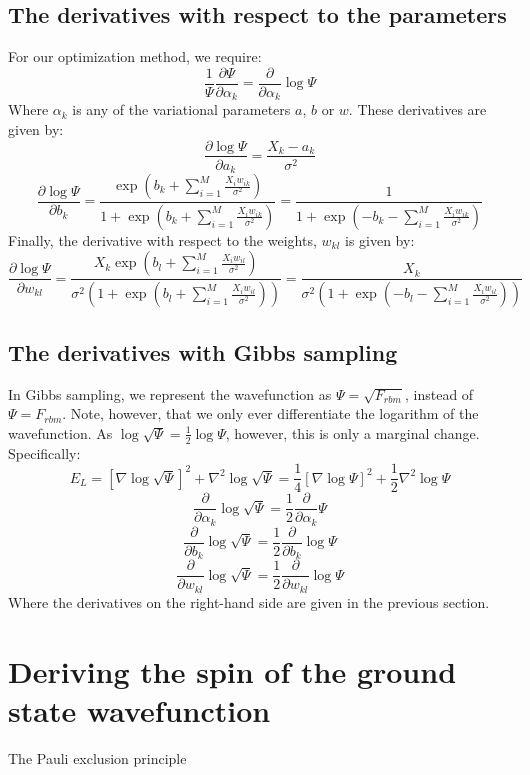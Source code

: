 \documentclass[a4paper, 10pt]{article}
\begin{document}
\begin{appendices}
	\subsection{The derivatives with respect to the parameters}
	For our optimization method, we require:
	\begin{equation}
	\frac{1}{\Psi}\frac{\partial \Psi}{\partial \alpha_k}=\frac{\partial }{\partial \alpha_k}\log \Psi
	\end{equation}
	Where $\alpha_k$ is any of the variational parameters $a$, $b$ or $w$. These derivatives are given by:
	\begin{equation}
	\frac{\partial \log \Psi }{\partial a_k}=\frac{X_k-a_k}{\sigma^2}
	\end{equation}
	\begin{equation}
	\frac{\partial \log \Psi}{\partial b_k}=\frac{\exp \left(b_k+\sum_{i=1}^M \frac{X_iw_{ik}}{\sigma^2}\right)}{1+\exp \left(b_k+\sum_{i=1}^M \frac{X_iw_{ik}}{\sigma^2}\right)}=\frac{1}{1+\exp \left(-b_k-\sum_{i=1}^M \frac{X_i w_{ik}}{\sigma^2}\right)}
	\end{equation}
	Finally, the derivative with respect to the weights, $w_{kl}$ is given by:
	\begin{equation}
	\frac{\partial \log \Psi}{\partial w_{kl}}=\frac{X_k\exp\left(b_l+\sum_{i=1}^M \frac{X_iw_{il}}{\sigma^2}\right)}{\sigma^2\left(1+\exp \left( b_l + \sum_{i=1}^M \frac{X_iw_{il}}{\sigma^2}\right)\right)}=\frac{X_k}{\sigma^2\left(1+\exp \left(-b_l-\sum_{i=1}^M \frac{X_iw_{il}}{\sigma^2}\right)\right)}
	\end{equation}
	\subsection{The derivatives with Gibbs sampling}
	In Gibbs sampling, we represent the wavefunction as $\Psi=\sqrt{F_{rbm}}$, instead of $\Psi=F_{rbm}$. Note, however, that we only ever differentiate the logarithm of the wavefunction. As $\log \sqrt{\Psi}=\frac{1}{2}\log \Psi$, however, this is only a marginal change. Specifically:
	\begin{equation}
	E_L=[\nabla \log \sqrt{\Psi}]^2 + \nabla^2 \log \sqrt{\Psi} =\frac{1}{4}[\nabla \log \Psi]^2 +\frac{1}{2}\nabla^2 \log \Psi
	\end{equation}
	\begin{equation}
	\frac{\partial }{\partial \alpha_k}\log \sqrt{\Psi}=\frac{1}{2}\frac{\partial }{\partial \alpha_k}\Psi
	\end{equation}
	\begin{equation}
	\frac{\partial }{\partial b_k}\log \sqrt{\Psi}=\frac{1}{2}\frac{\partial }{\partial b_k}\log \Psi 
	\end{equation}
	\begin{equation}
	\frac{\partial}{\partial w_{kl}}\log \sqrt{\Psi}=\frac{1}{2}\frac{\partial}{\partial w_{kl}}\log \Psi
	\end{equation}
	Where the derivatives on the right-hand side are given in the previous section.
	\section{Deriving the spin of the ground state wavefunction}
	The Pauli exclusion principle
	\end{appendices}
\end{document}
